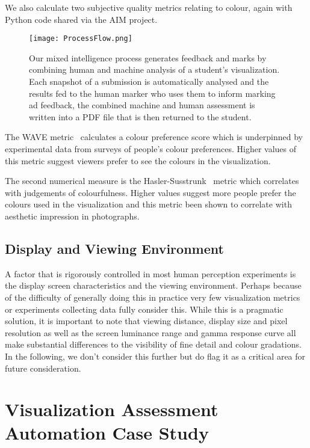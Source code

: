 We also calculate two subjective quality metrics relating to colour, again with Python code shared via the  AIM project. 

\begin{figure*}[htb]
  \centering
  \texttt{[image: ProcessFlow.png]}
  \caption{\label{fig:process}
           Our mixed intelligence process generates feedback and marks by combining human and machine analysis of a student's visualization. Each snapshot of a submission is automatically analysed and the results fed to the human marker who uses them to inform marking ad feedback, the combined machine and human assessment is written into a PDF file that is then returned to the student.}
\end{figure*}

The WAVE metric~\cite{palmer2010_WAVE} calculates a colour preference score which is underpinned by experimental data from surveys of people's colour preferences. Higher values of this metric suggest viewers prefer to see the colours in the visualization. 

The second numerical measure is the Hasler-Susstrunk~\cite{hasler2003} metric which correlates with judgements of colourfulness. Higher values suggest more people prefer the colours used in the visualization and this metric been shown to correlate with aesthetic impression in photographs.


\subsection{Display and Viewing Environment}

A factor that is rigorously controlled in most human perception experiments is the display screen characteristics and the viewing environment. Perhaps because of the difficulty of generally doing this in practice very few visualization metrics or experiments collecting data fully consider this.  While this is a pragmatic solution, it is important to note that viewing distance, display size and pixel resolution as well as the screen luminance range and gamma response curve all make substantial differences to the visibility of fine detail and colour gradations. In the following, we don't consider this further but do flag it as a critical area for future consideration. 

\section{Visualization Assessment Automation Case Study}

